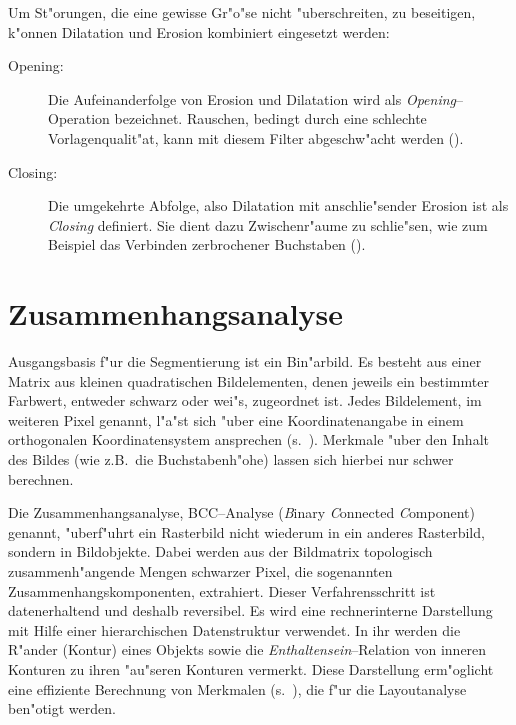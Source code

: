 Um St"orungen, die eine gewisse Gr"o"se nicht "uberschreiten, zu beseitigen, k"onnen Dilatation und
Erosion kombiniert eingesetzt werden:

\begin{description}
  \item[Opening:] Die Aufeinanderfolge von Erosion und Dilatation wird als {\em Opening\/}--
  Operation bezeichnet. Rauschen, bedingt durch eine schlechte Vorlagenqualit"at,
  kann mit diesem Filter abgeschw"acht werden ().
  
  
  \item[Closing:] Die umgekehrte Abfolge, also Dilatation mit anschlie"sender Erosion ist
  als \mbox{\em Closing\/} definiert. Sie dient dazu Zwischenr"aume zu schlie"sen, wie zum Beispiel
  das Verbinden zerbrochener Buchstaben ().
  
\end{description}

\section{Zusammenhangsanalyse}
\label{Zusammenhangsanalyse}

Ausgangsbasis f"ur die Segmentierung ist ein Bin"arbild. Es besteht aus einer Matrix aus
kleinen quadratischen Bildelementen, denen jeweils ein bestimmter Farbwert, entweder schwarz
oder wei"s, zugeordnet ist. Jedes Bildelement, im weiteren Pixel genannt, l"a"st sich "uber
eine Koordinatenangabe in einem orthogonalen Koordinatensystem ansprechen 
(s.~). Merkmale "uber den Inhalt des Bildes (wie z.B.\ die Buchstabenh"ohe)
lassen sich hierbei nur schwer berechnen.


Die Zusammenhangsanalyse, BCC--Analyse ({\em B\/}inary {\em C\/}onnected {\em C\/}omponent)
genannt, "uberf"uhrt ein Rasterbild nicht wiederum in ein anderes Rasterbild, sondern in
Bildobjekte. Dabei werden aus der Bildmatrix topologisch
zusammenh"angende Mengen schwarzer Pixel, die sogenannten Zusammenhangskomponenten, extrahiert.
Dieser Verfahrensschritt ist datenerhaltend und deshalb reversibel. Es wird
eine rechnerinterne Darstellung mit Hilfe einer hierarchischen Datenstruktur verwendet. In
ihr werden die R"ander (Kontur) eines Objekts sowie die {\em Enthaltensein\/}--Relation von
inneren Konturen zu ihren "au"seren Konturen vermerkt. Diese Darstellung erm"oglicht eine
effiziente Berechnung von Merkmalen (s.~), die f"ur
die Layoutanalyse ben"otigt werden. 

